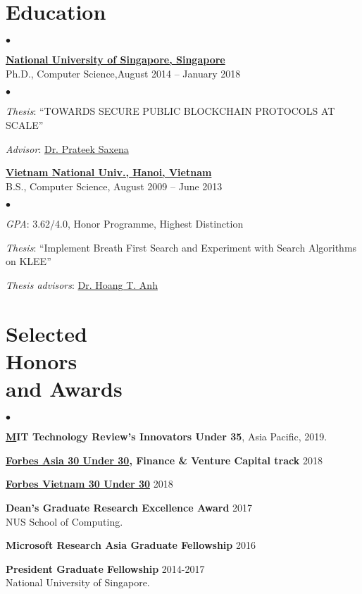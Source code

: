 \documentclass[margin,line]{res}
\newenvironment{list0}{
  \begin{list}{$\bullet$}{%
      \setlength{\itemsep}{0.08in}
      \setlength{\parsep}{0in} \setlength{\parskip}{0in}
      \setlength{\topsep}{0in} \setlength{\partopsep}{0in} 
      \setlength{\leftmargin}{0.0in}}}{\end{list}}
\newenvironment{list2}{
  \begin{list}{$\bullet$}{%
      \setlength{\itemsep}{0in}
      \setlength{\parsep}{0in} \setlength{\parskip}{0in}
      \setlength{\topsep}{0in} \setlength{\partopsep}{0in} 
      \setlength{\leftmargin}{0.2in}}}{\end{list}}
\begin{document}
\begin{resume}
\section{\sc Education}
\begin{list0}
\item \href{http://www.nus.edu.sg}{\textbf {National University of Singapore, Singapore}}\\
Ph.D.,  Computer Science,\hfill August 2014 -- January 2018\\
\vspace{-.1in}
\begin{list2}
\item \emph{Thesis}:  ``TOWARDS SECURE PUBLIC BLOCKCHAIN PROTOCOLS AT SCALE'' 
\item \emph{Advisor}: \href{http://www.comp.nus.edu.sg/~prateeks}{Dr. Prateek Saxena}
\end{list2}
\vspace{.1in}
\item \href{http://uet.vnu.nus.edu.vn}{\textbf{Vietnam National Univ., Hanoi, Vietnam}}\\
B.S., Computer Science, \hfill  August 2009 -- June 2013\\
\vspace{-.1in}
\begin{list2}
\item \emph{GPA}: 3.62/4.0, Honor Programme, Highest Distinction
\item \emph{Thesis}:  ``Implement Breath First Search and Experiment with Search Algorithms on KLEE'' 
\item \emph{Thesis advisors}: \href{http://uet.vnu.edu.vn/~hoangta}{Dr. Hoang T. Anh}
\end{list2}
\end{list0}

\section{\sc Selected\\ Honors \\ and Awards} 
\begin{list0}
\item {\bf \href{https://www.innovatorsunder35.com/the-list/loi-luu/}MIT Technology Review's Innovators Under 35}, Asia Pacific, \hfill 2019.
\item {\bf \href{https://www.forbes.com/30-under-30-asia/2018/finance-venture-capital/#2d0f2b5d547f}{Forbes Asia 30 Under 30}, Finance \& Venture Capital track} \hfill 2018
\item {\bf \href{http://event.forbesvietnam.com/30under30/luutheloi.html}{Forbes Vietnam 30 Under 30}} \hfill 2018
\item {\bf  Dean's Graduate Research Excellence Award} \hfill 2017\\
NUS School of Computing.
\item {\bf Microsoft Research Asia Graduate Fellowship} \hfill 2016
\item {\bf President Graduate Fellowship} \hfill 2014-2017\\
National University of Singapore.
\end{list0}


\end{resume}
\end{document}
